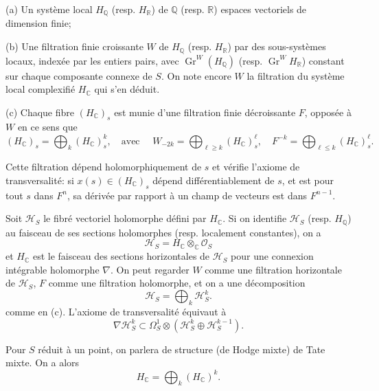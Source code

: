\documentclass[12pt,a4paper]{article}
\theoremstyle{plain}
\theoremstyle{definition}
\theoremstyle{remark}
\newcommand{\Q}{\mathbb{Q}}
\newcommand{\R}{\mathbb{R}}
\newcommand{\C}{\mathbb{C}}
\begin{document}
(a) Un syst{\`e}me local $H_\Q$ (resp. $H_\R$) de $\Q$ (resp. $\R$) espaces vectoriels de dimension finie;

(b) Une filtration finie croissante $W$ de $H_\Q$ (resp. $H_\R$) par des sous-syst{\`e}mes locaux, index{\'e}e par les entiers pairs, avec $\operatorname{Gr}^W(H_\Q)$ (resp. $\operatorname{Gr}^W H_\R$) constant sur chaque composante connexe de $S$. On note encore $W$ la filtration du syst{\`e}me local complexifi{\'e} $H_\C$ qui s'en d{\'e}duit.

(c) Chaque fibre $(H_\C)_s$ est munie d'une filtration finie d{\'e}croissante $F$, oppos{\'e}e {\`a} $W$ en ce sens que
\begin{equation}\label{eq:1.2.1}
(H_\C)_s = \bigoplus_k (H_\C)_s^k, \quad \text{avec }\quad W_{-2k} = \bigoplus_{\ell\geq k}(H_\C)_s^\ell, \quad F^{-k} = \bigoplus_{\ell\leq k}(H_\C)_s^\ell.
\tag{1.2.1}
\end{equation}

Cette filtration d{\'e}pend holomorphiquement de $s$ et v{\'e}rifie l'axiome de transversalit{\'e}: si $x(s)\in (H_\C)_s$ d{\'e}pend diff{\'e}rentiablement de $s$, et est pour tout $s$ dans $F^n$, sa d{\'e}riv{\'e}e par rapport {\`a} un champ de vecteurs est dans $F^{n-1}$.

Soit $\mathcal{H}_S$ le fibr{\'e} vectoriel holomorphe d{\'e}fini par $H_\C$. Si on identifie $\mathcal{H}_S$ (resp. $H_\Q$) au faisceau de ses sections holomorphes (resp. localement constantes), on a
\begin{equation*}
\mathcal{H}_S = H_\C \otimes_\C \mathcal{O}_S
\end{equation*}
et $H_\C$ est le faisceau des sections horizontales de $\mathcal{H}_S$ pour une connexion int{\'e}grable holomorphe $\nabla$. On peut regarder $W$ comme une filtration horizontale de $\mathcal{H}_S$, $F$ comme une filtration holomorphe, et on a une d{\'e}composition
\begin{equation}\label{eq:1.2.2}
\mathcal{H}_S = \bigoplus_k \mathcal{H}_S^k.
\tag{1.2.2}
\end{equation}
comme en (c). L'axiome de transversalit{\'e} {\'e}quivaut {\`a}
\begin{equation}\label{eq:1.2.3}
\nabla\mathcal{H}_S^k \subset \Omega_S^1 \otimes (\mathcal{H}_S^k \oplus \mathcal{H}_S^{k-1}).
\tag{1.2.3}
\end{equation}

Pour $S$ r{\'e}duit {\`a} un point, on parlera de structure (de Hodge mixte) de Tate mixte. On a alors
\begin{equation*}
H_\C = \bigoplus_k (H_\C)^k.
\end{equation*}
\end{document}
